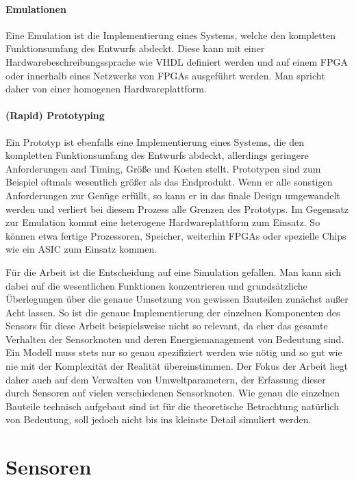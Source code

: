 \paragraph{Emulationen}

Eine Emulation ist die Implementierung eines Systems, welche den kompletten Funktionsumfang des Entwurfs abdeckt. Diese kann mit einer Hardwarebeschreibungssprache wie VHDL definiert werden und auf einem FPGA oder innerhalb eines Netzwerks von FPGAs ausgeführt werden. Man spricht daher von einer homogenen Hardwareplattform.

\paragraph{(Rapid) Prototyping}

Ein Prototyp ist ebenfalls eine Implementierung eines Systems, die den kompletten Funktionsumfang des Entwurfs abdeckt, allerdings geringere Anforderungen and Timing, Größe und Kosten stellt. Prototypen sind zum Beispiel oftmals wesentlich größer als das Endprodukt. Wenn er alle sonstigen Anforderungen zur Genüge erfüllt, so kann er in das finale Design umgewandelt werden und verliert bei diesem Prozess alle Grenzen des Prototyps. Im Gegensatz zur Emulation kommt eine heterogene Hardwareplattform zum Einsatz. So können etwa fertige Prozessoren, Speicher, weiterhin FPGAs oder spezielle Chips wie ein ASIC zum Einsatz kommen.

\endgraf

Für die Arbeit ist die Entscheidung auf eine Simulation gefallen. Man kann sich dabei auf die wesentlichen Funktionen konzentrieren und grundsätzliche Überlegungen über die genaue Umsetzung von gewissen Bauteilen zunächst außer Acht lassen. So ist die genaue Implementierung der einzelnen Komponenten des Sensors für diese Arbeit beispielsweise nicht so relevant, da eher das gesamte Verhalten der Sensorknoten und deren Energiemanagement von Bedeutung sind. Ein Modell muss stets nur so genau spezifiziert werden wie nötig und so gut wie nie mit der Komplexität der Realität übereinstimmen. \newline
Der Fokus der Arbeit liegt daher auch auf dem Verwalten von Umweltparametern, der Erfassung dieser durch Sensoren auf vielen verschiedenen Sensorknoten. Wie genau die einzelnen Bauteile technisch aufgebaut sind ist für die theoretische Betrachtung natürlich von Bedeutung, soll jedoch nicht bis ins kleinste Detail simuliert werden.

\section{Sensoren}

